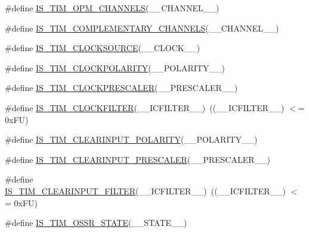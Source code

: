 \begin{DoxyCompactItemize}
\#define \hyperlink{group___t_i_m___private___macros_gab52ffb8447abc78141e296eff57c4371}{I\+S\+\_\+\+T\+I\+M\+\_\+\+O\+P\+M\+\_\+\+C\+H\+A\+N\+N\+E\+LS}(\+\_\+\+\_\+\+C\+H\+A\+N\+N\+E\+L\+\_\+\+\_\+)
\item 
\#define \hyperlink{group___t_i_m___private___macros_ga9fc980a033653d2bfc5d7afe9b65ca9f}{I\+S\+\_\+\+T\+I\+M\+\_\+\+C\+O\+M\+P\+L\+E\+M\+E\+N\+T\+A\+R\+Y\+\_\+\+C\+H\+A\+N\+N\+E\+LS}(\+\_\+\+\_\+\+C\+H\+A\+N\+N\+E\+L\+\_\+\+\_\+)
\item 
\#define \hyperlink{group___t_i_m___private___macros_gaebd00b3c8dd1c689e9d04850333ba719}{I\+S\+\_\+\+T\+I\+M\+\_\+\+C\+L\+O\+C\+K\+S\+O\+U\+R\+CE}(\+\_\+\+\_\+\+C\+L\+O\+C\+K\+\_\+\+\_\+)
\item 
\#define \hyperlink{group___t_i_m___private___macros_ga9bc34f35e8001150847d8cb4c7106fe9}{I\+S\+\_\+\+T\+I\+M\+\_\+\+C\+L\+O\+C\+K\+P\+O\+L\+A\+R\+I\+TY}(\+\_\+\+\_\+\+P\+O\+L\+A\+R\+I\+T\+Y\+\_\+\+\_\+)
\item 
\#define \hyperlink{group___t_i_m___private___macros_gacffcfebcabdbe12264d1f09775693972}{I\+S\+\_\+\+T\+I\+M\+\_\+\+C\+L\+O\+C\+K\+P\+R\+E\+S\+C\+A\+L\+ER}(\+\_\+\+\_\+\+P\+R\+E\+S\+C\+A\+L\+E\+R\+\_\+\+\_\+)
\item 
\#define \hyperlink{group___t_i_m___private___macros_ga7e2a89ace1305fce9bec2cf6d290389f}{I\+S\+\_\+\+T\+I\+M\+\_\+\+C\+L\+O\+C\+K\+F\+I\+L\+T\+ER}(\+\_\+\+\_\+\+I\+C\+F\+I\+L\+T\+E\+R\+\_\+\+\_\+)~((\+\_\+\+\_\+\+I\+C\+F\+I\+L\+T\+E\+R\+\_\+\+\_\+) $<$= 0x\+F\+U)
\item 
\#define \hyperlink{group___t_i_m___private___macros_ga0e0cafe2b21ee029a89cba1a400fa21c}{I\+S\+\_\+\+T\+I\+M\+\_\+\+C\+L\+E\+A\+R\+I\+N\+P\+U\+T\+\_\+\+P\+O\+L\+A\+R\+I\+TY}(\+\_\+\+\_\+\+P\+O\+L\+A\+R\+I\+T\+Y\+\_\+\+\_\+)
\item 
\#define \hyperlink{group___t_i_m___private___macros_ga861bb16ad77e0ede52a3d5f296583d0b}{I\+S\+\_\+\+T\+I\+M\+\_\+\+C\+L\+E\+A\+R\+I\+N\+P\+U\+T\+\_\+\+P\+R\+E\+S\+C\+A\+L\+ER}(\+\_\+\+\_\+\+P\+R\+E\+S\+C\+A\+L\+E\+R\+\_\+\+\_\+)
\item 
\#define \hyperlink{group___t_i_m___private___macros_gaf8f726fb3929b2fe50099b21eec9a738}{I\+S\+\_\+\+T\+I\+M\+\_\+\+C\+L\+E\+A\+R\+I\+N\+P\+U\+T\+\_\+\+F\+I\+L\+T\+ER}(\+\_\+\+\_\+\+I\+C\+F\+I\+L\+T\+E\+R\+\_\+\+\_\+)~((\+\_\+\+\_\+\+I\+C\+F\+I\+L\+T\+E\+R\+\_\+\+\_\+) $<$= 0x\+F\+U)
\item 
\#define \hyperlink{group___t_i_m___private___macros_ga9781b1128c61785dd818f64d83f4cb77}{I\+S\+\_\+\+T\+I\+M\+\_\+\+O\+S\+S\+R\+\_\+\+S\+T\+A\+TE}(\+\_\+\+\_\+\+S\+T\+A\+T\+E\+\_\+\+\_\+)

\end{DoxyCompactItemize}
